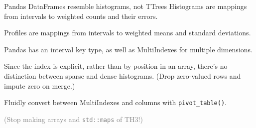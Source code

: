 \documentclass[aspectratio=169]{beamer}
\begin{document}
\begin{frame}[fragile]{Pandas DataFrames resemble histograms, not TTrees}
\large
\vspace{0.5 cm}
Histograms are mappings from intervals to weighted counts and their errors.

\vspace{0.5 cm}
Profiles are mappings from intervals to weighted means and standard deviations.

\vspace{0.5 cm}
Pandas has an interval key type, as well as MultiIndexes for multiple dimensions.

\vspace{0.5 cm}
Since the index is explicit, rather than by position in an array, there's no distinction between sparse and dense histograms. (Drop zero-valued rows and impute zero on merge.)

\vspace{0.5 cm}
Fluidly convert between MultiIndexes and columns with {\normalsize\texttt{pivot_table()}}.

\vspace{0.5 cm}
\textcolor{gray}{(Stop making arrays and {\normalsize\texttt{std::maps}} of TH3!)}
\end{frame}
\end{document}
